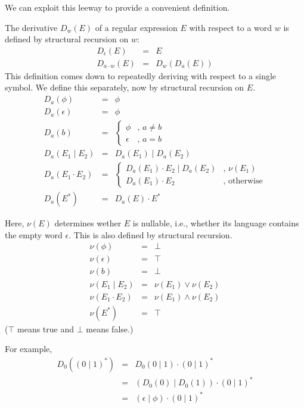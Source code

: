 We can exploit this leeway to provide a convenient definition.
\begin{definition}\label{def:derivative}
The derivative $D_w(E)$ of a regular expression $E$ with respect to a word $w$ is
defined by structural recursion on $w$: 
\begin{eqnarray*}
D_\epsilon(E)     & = & E \\
D_{a \cdot w}(E)  & = & D_w(D_a(E))
\end{eqnarray*}
This definition comes down to repeatedly deriving with respect to a single
symbol. We define this separately, now by structural recursion on $E$.
\begin{eqnarray*}
D_a(\phi)           & = & \phi \\
D_a(\epsilon)       & = & \phi \\
D_a(b)              & = & \left\{ \begin{array}{ll} \phi & \text{, }a \neq b \\ \epsilon & \text{, }a = b \end{array}\right. \\
D_a(E_1 \mid E_2)   & = & D_a(E_1) \mid D_a(E_2) \\
D_a(E_1 \cdot E_2)  & = & \left\{ \begin{array}{ll} D_a(E_1) \cdot E_2 \mid D_a(E_2) & \text{, }\nu(E_1)  \\ D_a(E_1) \cdot E_2 & \text{, otherwise} \end{array}\right. \\
D_a(E^*)            & = & D_a(E) \cdot E^*
\end{eqnarray*}

Here, $\nu(E)$ determines wether $E$ is nullable, i.e., whether its language
contains the empty word $\epsilon$. This is also defined by structural recursion.
\begin{eqnarray*}
\nu(\phi)           & = & \bot \\
\nu(\epsilon)       & = & \top \\
\nu(b)              & = & \bot \\
\nu(E_1 \mid E_2)   & = & \nu(E_1) \vee \nu(E_2)  \\
\nu(E_1 \cdot E_2)  & = & \nu(E_1) \wedge \nu(E_2) \\
\nu(E^*)            & = & \top
\end{eqnarray*}
($\top$ means true and $\bot$ means false.)
\end{definition}

For example, 
\begin{eqnarray*}
D_0( (0 \mid 1)^*) & = & D_0( 0 \mid 1) \cdot (0 \mid 1)^* \\
                   & = & (D_0(0) \mid D_0(1)) \cdot (0 \mid 1)^* \\
                   & = & (\epsilon \mid \phi) \cdot (0 \mid 1)^*
\end{eqnarray*}

